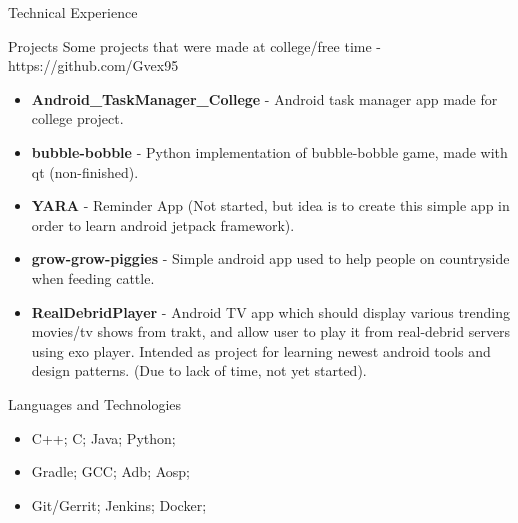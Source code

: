 \documentclass[]{mcdowellcv}
\begin{document}
	\begin{cvsection}{Technical Experience}
		\begin{cvsubsection}{Projects}{}{}
			Some projects that were made at college/free time  - https://github.com/Gvex95
			\begin{itemize}
				\item \textbf{Android\_TaskManager\_College} - Android task manager app made for college project.
				\item \textbf{bubble-bobble} - Python implementation of bubble-bobble game, made with qt (non-finished).
				\item \textbf{YARA} - Reminder App (Not started, but idea is to create this simple app in order to learn android jetpack framework).
				\item \textbf{grow-grow-piggies} - Simple android app used to help people on countryside when feeding cattle.
				\item \textbf{RealDebridPlayer} - Android TV app which should display various trending movies/tv shows from trakt,
	and allow user to play it from real-debrid servers using exo player. Intended as project for learning newest android tools and design patterns. (Due to lack of time, not yet started).
			\end{itemize}
		\end{cvsubsection}
	\end{cvsection}

	\begin{cvsection}{Languages and Technologies}
		\begin{cvsubsection}{}{}{}
			\begin{itemize}
				\item C++; C; Java; Python;
				\item Gradle; GCC; Adb; Aosp;
				\item Git/Gerrit; Jenkins; Docker;
			\end{itemize}
		\end{cvsubsection}
	\end{cvsection}
\end{document}
